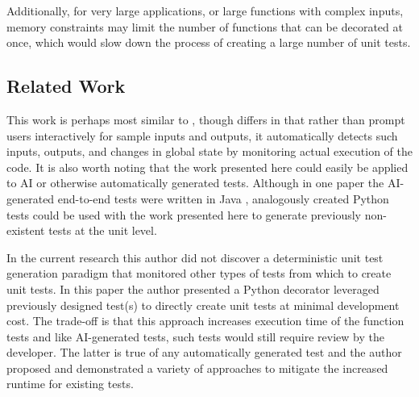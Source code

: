 Additionally, for very large applications, or large
functions with complex inputs, memory constraints may 
limit the number of functions that can be decorated at once,
which would slow down the process of creating 
a large number of unit tests.

\subsection{Related Work}\label{sec:related-work}
This work is perhaps most similar to 
\cite{lahiri2023interactivecodegenerationtestdriven}, though
differs in that rather than prompt users interactively for sample inputs and
outputs, it automatically detects such inputs, outputs, and changes in global
state by monitoring actual execution of the code.  It is also worth noting 
that the work presented here could easily be applied to AI or otherwise 
automatically generated tests.  Although in one paper the AI-generated end-to-end tests 
were written in Java \cite{leotta2024ai}, analogously created Python tests could
be used with the work presented here to generate previously non-existent 
tests at the unit level.

In the current research this author did not discover a deterministic 
unit test generation paradigm that monitored other types of
tests from which to create unit tests.  In this paper the author presented
a Python decorator leveraged previously designed test(s) to directly create 
unit tests at minimal development cost.
The trade-off is that this approach increases execution time of the function 
tests and like AI-generated tests, such tests would still require review by the 
developer. The latter is true of any automatically generated test and 
the author proposed and demonstrated a variety of approaches to 
mitigate the increased runtime for existing tests.

